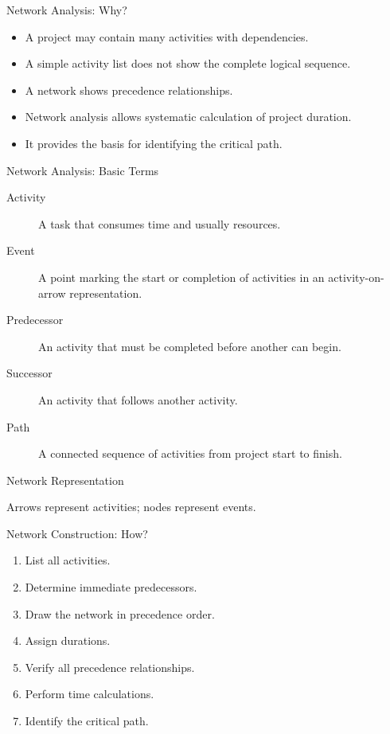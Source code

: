 \documentclass[aspectratio=169,10pt]{beamer}
\begin{document}
\begin{frame}{Network Analysis: Why?}
\begin{itemize}
  \item A project may contain many activities with dependencies.
  \item A simple activity list does not show the complete logical sequence.
  \item A network shows precedence relationships.
  \item Network analysis allows systematic calculation of project duration.
  \item It provides the basis for identifying the critical path.
\end{itemize}
\end{frame}

\begin{frame}{Network Analysis: Basic Terms}
\begin{description}
\item[Activity] A task that consumes time and usually resources.
\item[Event] A point marking the start or completion of activities in an activity-on-arrow representation.
\item[Predecessor] An activity that must be completed before another can begin.
\item[Successor] An activity that follows another activity.
\item[Path] A connected sequence of activities from project start to finish.
\end{description}
\end{frame}

\begin{frame}{Network Representation}
\centering
{}
\vspace{0.3cm}

Arrows represent activities; nodes represent events.
\end{frame}

\begin{frame}{Network Construction: How?}
\begin{enumerate}
  \item List all activities.
  \item Determine immediate predecessors.
  \item Draw the network in precedence order.
  \item Assign durations.
  \item Verify all precedence relationships.
  \item Perform time calculations.
  \item Identify the critical path.
\end{enumerate}
\end{frame}
\end{document}
